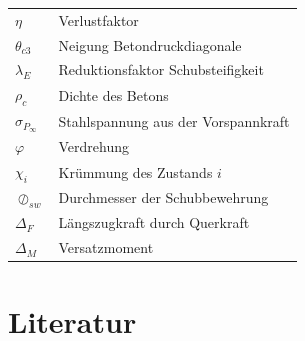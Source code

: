 \documentclass[
  11pt,
  letterpaper,
]{scrreprt}
\begin{document}
\begin{longtable}[]{@{}
  >{\raggedright\arraybackslash}p{}
  >{\raggedright\arraybackslash}p{}@{}}
\(\eta\) & Verlustfaktor \\
\(\theta_{c3}\) & Neigung Betondruckdiagonale \\
\(\lambda_E\) & Reduktionsfaktor Schubsteifigkeit \\
\(\rho_c\) & Dichte des Betons \\
\(\sigma_{P_\infty}\) & Stahlspannung aus der Vorspannkraft \\
\(\varphi\) & Verdrehung \\
\(\chi_i\) & Krümmung des Zustands \(i\) \\
\(\oslash_{sw}\) & Durchmesser der Schubbewehrung \\
\(\Delta_F\) & Längszugkraft durch Querkraft \\
\(\Delta_M\) & Versatzmoment \\
\end{longtable}


\chapter*{Literatur}\label{literatur}

\end{document}
